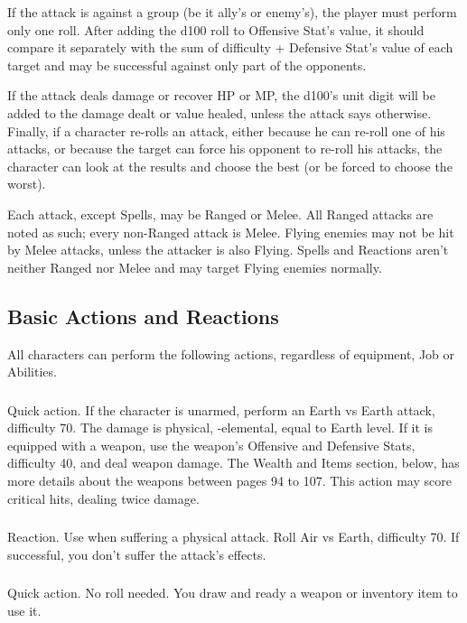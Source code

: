 \begin{multicols}{2}
If the attack is against a group (be it ally’s or enemy’s), the player must perform only one roll. After adding the d100 roll to Offensive Stat’s value, it should compare it separately with the sum of difficulty + Defensive Stat’s value of each target and may be successful against only part of the opponents.

If the attack deals damage or recover HP or MP, the d100’s unit digit will be added to the damage dealt or value healed, unless the attack says otherwise. Finally, if a character re-rolls an attack, either because he can re-roll one of his attacks, or because the target can force his opponent to re-roll his attacks, the character can look at the results and choose the best (or be forced to choose the worst).

Each attack, except Spells, may be Ranged or Melee. All Ranged attacks are noted as such; every non-Ranged attack is Melee. Flying enemies may not be hit by Melee attacks, unless the attacker is also Flying. Spells and Reactions aren't neither Ranged nor Melee and may target Flying enemies normally.

\subsection{Basic Actions and Reactions}\label{subsec:basicactions}
All characters can perform the following actions, regardless of equipment, Job or Abilities.

\subsubsection{}
Quick action. If the character is unarmed, perform an Earth vs Earth attack, difficulty 70. The damage is physical, -elemental, equal to Earth level. If it is equipped with a weapon, use the weapon’s Offensive and Defensive Stats, difficulty 40, and deal weapon damage. The Wealth and Items section, below, has more details about the weapons between pages 94 to 107. This action may score critical hits, dealing twice damage.

\subsubsection{}
Reaction. Use when suffering a physical attack. Roll Air vs Earth, difficulty 70. If successful, you don’t suffer the attack’s effects.

\subsubsection{}
Quick action. No roll needed. You draw and ready a weapon or inventory item to use it.


\end{multicols}
